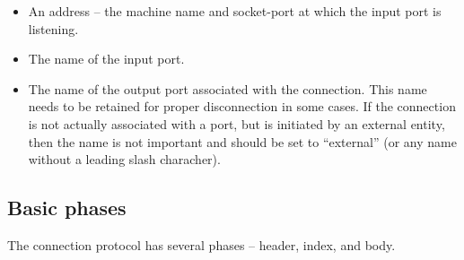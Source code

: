 \documentclass[a4]{article}
\begin{document}
\begin{itemize}

\item An address -- the machine name and socket-port at which
the input port is listening.

\item The name of the input port.

\item The name of the output port associated with the
connection.  This name
needs to be retained for proper disconnection in some cases.
If the connection is not actually associated with a port,
but is initiated by an external entity, then the name is
not important and should be set to ``external'' (or any
name without a leading slash characher).

\end{itemize}

\subsection{Basic phases}

The connection protocol has several phases -- header,
index, and body.
\end{document}
